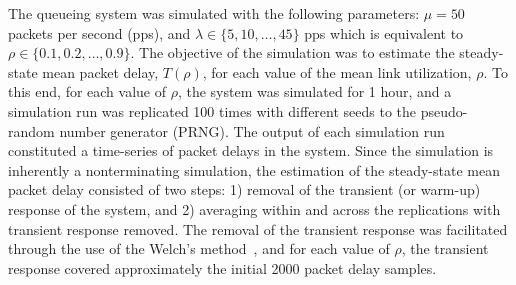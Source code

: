The queueing system was simulated with the following parameters: $\mu=50$ packets per second (pps), and $\lambda\in\{5,10,\ldots,45\}$ pps which is equivalent to $\rho\in\{0.1,0.2,\ldots,0.9\}$. The objective of the simulation was to estimate the steady-state mean packet delay, $T(\rho)$, for each value of the mean link utilization, $\rho$. To this end, for each value of $\rho$, the system was simulated for 1 hour, and a simulation run was replicated 100 times with different seeds to the pseudo-random number generator (PRNG). The output of each simulation run constituted a time-series of packet delays in the system. Since the simulation is inherently a nonterminating simulation, the estimation of the steady-state mean packet delay consisted of two steps: 1) removal of the transient (or warm-up) response of the system, and 2) averaging within and across the replications with transient response removed. The removal of the transient response was facilitated through the use of the Welch's method~\cite{LawChapter92007}, and for each value of $\rho$, the transient response covered approximately the initial 2000 packet delay samples.

